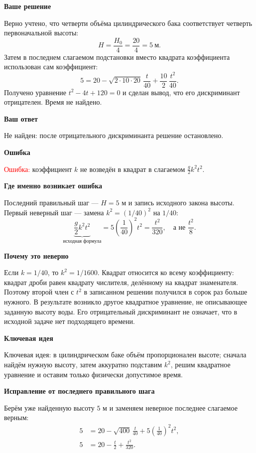 \documentclass[12pt,a4paper]{article}
\newcommand{\reviewline}[1]{\par\medskip\textbf{#1}\par\smallskip}
\begin{document}
\reviewline{Ваше решение}
Верно учтено, что четверти объёма цилиндрического бака соответствует четверть первоначальной высоты:
\[
H=\frac{H_0}{4}=\frac{20}{4}=5\ \text{м}.
\]
Затем в последнем слагаемом подстановки вместо квадрата коэффициента использован сам коэффициент:
\[
5=20-\sqrt{2\cdot10\cdot20}\,\frac{t}{40}
  +\frac{10}{2}\,\frac{t^2}{40}.
\]
Получено уравнение $t^2-4t+120=0$ и сделан вывод, что его дискриминант отрицателен. Время не найдено.

\reviewline{Ваш ответ}
Не найден: после отрицательного дискриминанта решение остановлено.

\reviewline{Ошибка}
\textcolor{red}{Ошибка:} коэффициент $k$ не возведён в квадрат в слагаемом $\frac{g}{2}k^2t^2$.

\reviewline{Где именно возникает ошибка}
Последний правильный шаг --- $H=5$ м и запись исходного закона высоты. Первый неверный шаг --- замена $k^2=(1/40)^2$ на $1/40$:
\[
\underbrace{\frac{g}{2}k^2t^2}_{\text{исходная формула}}
=5\left(\frac1{40}\right)^2t^2
=\frac{t^2}{320},
\quad\text{а не }\frac{t^2}{8}.
\]

\reviewline{Почему это неверно}
Если $k=1/40$, то $k^2=1/1600$. Квадрат относится ко всему коэффициенту: квадрат дроби равен квадрату числителя, делённому на квадрат знаменателя. Поэтому второй член с $t^2$ в записанном решении получился в сорок раз больше нужного. В результате возникло другое квадратное уравнение, не описывающее заданную высоту воды. Его отрицательный дискриминант не означает, что в исходной задаче нет подходящего времени.

\reviewline{Ключевая идея}
\textcolor{blue!60!black}{Ключевая идея:} в цилиндрическом баке объём пропорционален высоте; сначала найдём нужную высоту, затем аккуратно подставим $k^2$, решим квадратное уравнение и оставим только физически допустимое время.

\reviewline{Исправление от последнего правильного шага}
Берём уже найденную высоту $5$ м и заменяем неверное последнее слагаемое верным:
\[
\begin{aligned}
5&=20-\sqrt{400}\,\frac{t}{40}
  +5\left(\frac1{40}\right)^2t^2,\\
5&=20-\frac{t}{2}+\frac{t^2}{320}.
\end{aligned}
\]
\end{document}

